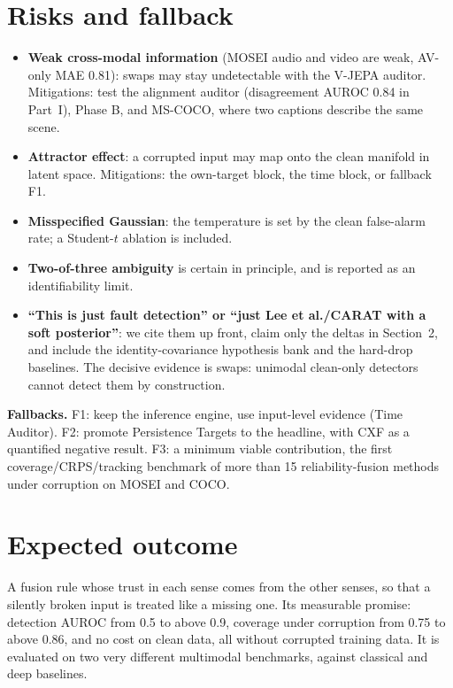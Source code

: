 \documentclass[10pt,twocolumn]{article}
\begin{document}
\section{Risks and fallback}
\begin{itemize}
\item \textbf{Weak cross-modal information} (MOSEI audio and video are weak, AV-only MAE 0.81): swaps may stay
  undetectable with the V-JEPA auditor. Mitigations: test the alignment auditor (disagreement AUROC 0.84 in Part~I),
  Phase B, and MS-COCO, where two captions describe the same scene.
\item \textbf{Attractor effect}: a corrupted input may map onto the clean manifold in latent space. Mitigations: the
  own-target block, the time block, or fallback F1.
\item \textbf{Misspecified Gaussian}: the temperature is set by the clean false-alarm rate; a Student-$t$ ablation is
  included.
\item \textbf{Two-of-three ambiguity} is certain in principle, and is reported as an identifiability limit.
\item \textbf{``This is just fault detection'' or ``just Lee et al./CARAT with a soft posterior''}: we cite them up
  front, claim only the deltas in Section~2, and include the identity-covariance hypothesis bank and the hard-drop
  baselines. The decisive evidence is swaps: unimodal clean-only detectors cannot detect them by construction.
\end{itemize}
\textbf{Fallbacks.} F1: keep the inference engine, use input-level evidence (Time Auditor). F2: promote Persistence
Targets to the headline, with CXF as a quantified negative result. F3: a minimum viable contribution, the first
coverage/CRPS/tracking benchmark of more than 15 reliability-fusion methods under corruption on MOSEI and COCO.

\section{Expected outcome}
A fusion rule whose trust in each sense comes from the other senses, so that a silently broken input is treated like
a missing one. Its measurable promise: detection AUROC from 0.5 to above 0.9, coverage under corruption from
0.75 to above 0.86, and no cost on clean data, all without corrupted training data. It is evaluated on two very
different multimodal benchmarks, against classical and deep baselines.

{\small


}
\end{document}
